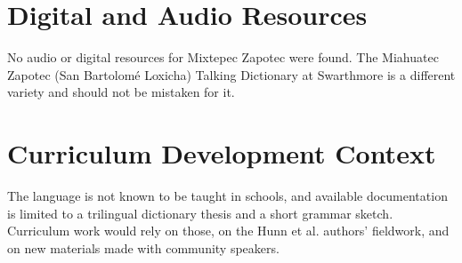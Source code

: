 \documentclass[12pt]{article}
\begin{document}
\section{Digital and Audio Resources}
No audio or digital resources for Mixtepec Zapotec were found. The Miahuatec Zapotec (San Bartolom\'e Loxicha) Talking Dictionary at Swarthmore is a different variety and should not be mistaken for it.

\section{Curriculum Development Context}
The language is not known to be taught in schools, and available documentation is limited to a trilingual dictionary thesis and a short grammar sketch. Curriculum work would rely on those, on the Hunn et al. authors' fieldwork, and on new materials made with community speakers.
\end{document}
